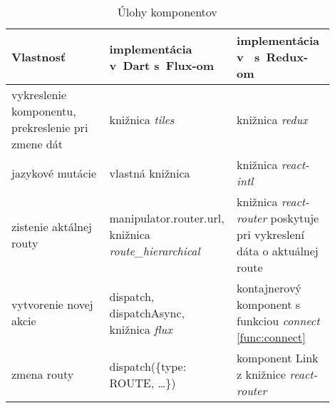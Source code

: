 \begin{comment}
\paragraph{Komponenty v JavaScripte s Redux-om}
V JavaScriptovej aplikácii máme dva typy komponentov: kontajnerové a prezenčné. 

Prezenčné sú jednoduchšie, priamočiarejšie. Všetky parametre, ktoré potrebujú, by mali dostať od volajúceho komponentu (vrátane funkcií na vytváranie akcií). Nemajú prístup ku celému stavu aplikácie. Mali by to byť hlavne znovu použiteľné komponenty (napríklad riadok tabuľky).

Kontajnerové komponenty sú o niečo zložitejšie. Majú prístup ku celému stavu aplikácie, z ktorého si vyberajú len potrebné časti. Na to nám pomáha funkcia \emph{connect} z knižnice \emph{react-redux}. Kontajnerový komponent vyzerá podobne ako prezenčný, tiež všetko vykresľuje len zo svojich parametrov. 
Funkcia \emph{connect} tvorí medzivrstvu medzi týmto komponentom a jeho exportovaným variantom. Do tohoto komponentu doplní potrebné dáta zo stavu. Tieto komponenty sú však menej univerzálne, keďže sú viazané na konkrétne dáta zo stavu.
\end{comment}

\NEW{}
\begin{table}
  \caption{Úlohy komponentov}
  \label{table:components}
  \begin{tabular}{| p{0.3\linewidth} | p{0.3\linewidth} | p{0.3\linewidth} |}
   \hline
     Vlastnosť & implementácia v~Dart s~Flux-om & implementácia v~\JS{} s~Redux-om \\
    \hline
    \hline
     vykreslenie komponentu, prekreslenie pri zmene dát & 
     knižnica \emph{tiles} &
     knižnica \emph{redux} \\
    \hline
     jazykové mutácie & 
     vlastná knižnica & 
     knižnica \emph{react-intl} \\
    \hline
     zistenie aktálnej routy & 
     manipulator.router.url, knižnica \emph{route\_hierarchical} & 
     knižnica \emph{react-router} poskytuje pri vykreslení dáta o aktuálnej route \\
    \hline
     vytvorenie novej akcie & 
     dispatch, dispatchAsync, knižnica \emph{flux} & 
     kontajnerový komponent s funkciou \emph{connect} \ref{func:connect} \\
    \hline
     zmena routy & 
     dispatch(\{type: ROUTE, \ldots\}) & 
     komponent Link z knižnice \emph{react-router} \\
    \hline
   \end{tabular}
\end{table}

